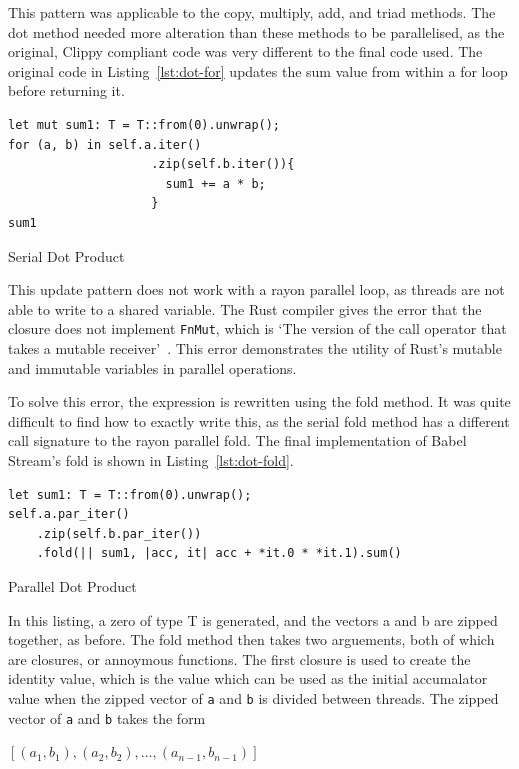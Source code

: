This pattern was applicable to the copy, multiply, add, and triad methods. The dot method needed more alteration than these methods to be parallelised, as the original, Clippy compliant code was very different to the final code used. The original code in Listing~\ref{lst:dot-for} updates the sum value from within a for loop before returning it.
\begin{listing}
    \label{lst:dot-for}
\begin{verbatim}
let mut sum1: T = T::from(0).unwrap();
for (a, b) in self.a.iter()
                    .zip(self.b.iter()){
                      sum1 += a * b;
                    }
sum1
\end{verbatim}
\caption{Serial Dot Product}
\end{listing}
This update pattern does not work with a rayon parallel loop, as threads are not able to write to a shared variable. The Rust compiler gives the error that the closure does not implement \texttt{FnMut}, which is `The version of the call operator that takes a mutable receiver'~\cite{rust-doc-fnmut}. This error demonstrates the utility of Rust's mutable and immutable variables in parallel operations.

To solve this error, the expression is rewritten using the fold method. It was quite difficult to find how to exactly write this, as the serial fold method has a different call signature to the rayon parallel fold. The final implementation of Babel Stream's fold is shown in Listing~\ref{lst:dot-fold}.
\begin{listing}
    \label{lst:dot-fold}
\begin{verbatim}
let sum1: T = T::from(0).unwrap();
self.a.par_iter()
    .zip(self.b.par_iter())
    .fold(|| sum1, |acc, it| acc + *it.0 * *it.1).sum()
\end{verbatim}
    \caption{Parallel Dot Product}
\end{listing}
In this listing, a zero of type T is generated, and the vectors a and b are zipped together, as before. The fold method then takes two arguements, both of which are closures, or annoymous functions. The first closure is used to create the identity value, which is the value which can be used as the initial accumalator value when the zipped vector of \texttt{a} and \texttt{b} is divided between threads. The zipped vector of \texttt{a} and \texttt{b} takes the form

\begin{center}
$[(a_1, b_1), (a_2, b_2), \ldots, (a_{n-1}, b_{n-1})]$
\end{center}

